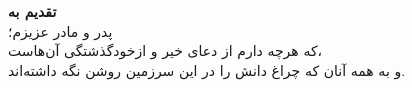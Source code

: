 \thispagestyle{empty}
\vspace*{\fill}
\begin{center}
{\Large\bfseries تقدیم به}\\[6mm]
{\large پدر و مادر عزیزم؛\\[2mm]
که هرچه دارم از دعای خیر و ازخودگذشتگی آن‌هاست،\\[2mm]
و به همه آنان که چراغ دانش را در این سرزمین روشن نگه داشته‌اند.}
\end{center}
\vspace*{\fill}
\clearpage
